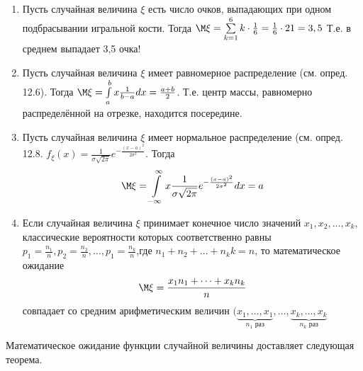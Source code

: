 \begin{example}
	\begin{enumerate}
		\item Пусть случайная величина $\xi$ есть число очков, выпадающих при одном подбрасывании игральной кости. Тогда $\M\xi=\sum\limits_{k=1}^6k\cdot\frac{1}{6}=\frac{1}{6}\cdot21=3,5$ Т.е. в среднем выпадает 3,5 очка!

		\item Пусть случайная величина $\xi$ имеет равномерное распределение (см.
		опред. 12.6). Тогда $\M\xi=\int\limits_a^b x\frac{1}{b-a}dx=\frac{a+b}{2}$. Т.е. центр массы, равномерно распределённой на отрезке, находится посередине.

		\item Пусть случайная величина $\xi$ имеет нормальное распределение (см.
		опред. 12.8. $f_{\xi}(x)=\frac{1}{\sigma\sqrt{2\pi}}e^{-\frac{(x-a)^2}{2\sigma^2}}$. Тогда
			\begin{equation*}
				\M\xi=\int\limits_{-\infty}^{\infty} 
				x\frac{1}{\sigma\sqrt{2\pi}}
				e^{-\frac{(x-a)^2}{2\sigma^2}}dx=a
			\end{equation*}

		\item Если случайная величина $\xi$ принимает конечное число значений $x_1,x_2,\dots, x_k$, классические вероятности которых соответственно равны $p_1 =\frac{n_1}{n},p_2 =\frac{n_2}{n},\dots,p_1 =\frac{n_k}{n}$,где $n_1 + n_2 + \dots + n_kk = n$, то математическое ожидание
		\begin{equation*}
			\M \xi=\frac{x_1n_1+\dots+x_kn_k}{n}
		\end{equation*}
		совпадает со средним арифметическим величин 
		$(\underbrace{x_1,\ldots , x_1}_{n_1 \text{ раз}},\ldots,\underbrace{x_k,\ldots,x_k}_{n_k \text{ раз}} $
	\end{enumerate}

\end{example}

Математическое ожидание функции случайной величины доставляет
следующая теорема.

